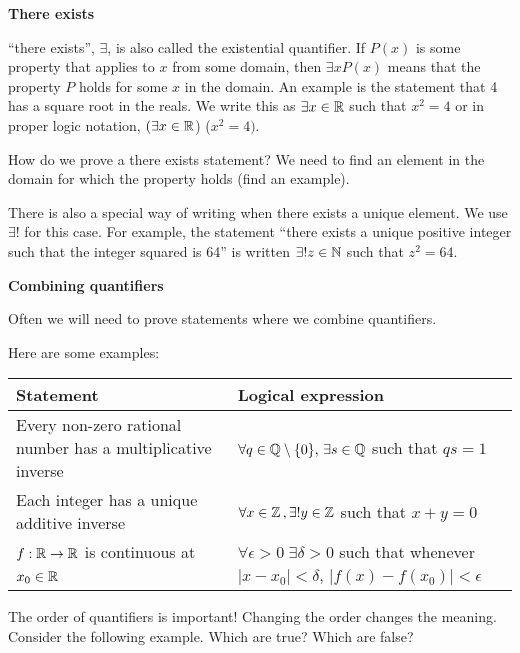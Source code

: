 \documentclass{article}
\begin{document}
\vspace{1em}

\textbf{There exists}

``there exists'', $\exists$, is also called the existential quantifier. If $P(x)$ is some property that applies to $x$ from some domain, then $\exists x P(x)$ means that the property $P$ holds for some $x$ in the domain. An example is the statement that 4 has a square root in the reals. We write this as $\exists x \in {\mathbb{R}}$ such that $x^2 = 4$ or in proper logic notation, $(\exists x \in {\mathbb{R}}$) ($x^2 = 4)$.

\vspace{1em}

How do we prove a there exists statement? We need to find an element in the domain for which the property holds (find an example).

\vspace{1em}

There is also a special way of writing when there exists a unique element. We use $\exists!$ for this case. For example, the statement ``there exists a unique positive integer such that the integer squared is 64'' is written $\exists!  z \in {\mathbb{N}}$ such that $z^2 = 64$.


\vspace{1em}

\textbf{Combining quantifiers}

Often we will need to prove statements where we combine quantifiers.

Here are some examples:
\vspace{1em}


\begin{tabular}{p{} p{}}
     Statement & Logical expression \\
     \hline
     Every non-zero rational number has a multiplicative inverse & $\forall q \in {\mathbb{Q}} \setminus \{0\}, \, \exists s \in {\mathbb{Q}}$ such that $qs=1$ \\
     Each integer has a unique additive inverse & $\forall x \in {\mathbb{Z}} \, , \exists ! y \in {\mathbb{Z}}$ such that $x+y = 0$ \\
     $f:{\mathbb{R}} \to {\mathbb{R}}$ is continuous at $x_0\in{\mathbb{R}}$ \ &  $\forall \epsilon >0 \; \exists \delta > 0$ such that whenever $|x - x_0| < \delta$, $|f(x)-f(x_0)| < \epsilon$
\end{tabular}

\vspace{1em}


The order of quantifiers is important! Changing the order changes the meaning. Consider the following example. Which are true? Which are false?
\end{document}
